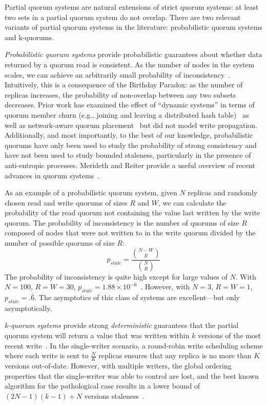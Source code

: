 \documentclass{vldb}
\begin{document}
Partial quorum systems are natural extensions of strict quorum
systems: at least two sets in a partial quorum system do not
overlap.  There are two relevant variants of partial quorum systems in
the literature: probabilistic quorum systems and k-quorums.

\textit{Probabilistic quorum systems} provide probabilistic guarantees
about whether data returned by a quorum read is consistent.  As the
number of nodes in the system scales, we can achieve an arbitrarily
small probability of inconsistency~\cite{prob-quorum}.  Intuitively,
this is a consequence of the Birthday Paradox: as the number of
replicas increases, the probability of non-overlap between any two
subsets decreases.  Prior work has examined the effect of ``dynamic
systems'' in terms of quorum member churn (e.g., joining and leaving a
distributed hash table)~\cite{prob-quorum-dynamic} as well as
network-aware quorum placement~\cite{delay-quorum, quorum-placement}
but did not model write propagation. Additionally, and most
importantly, to the best of our knowledge, probabilistic quorums have
only been used to study the probability of strong consistency and have
not been used to study bounded staleness, particularly in the presence
of anti-entropic processes.  Merideth and Reiter provide a useful
overview of recent advances in quorum systems~\cite{quorum-overview}.

As an example of a probabilistic quorum system, given $N$ replicas and
randomly chosen read and write quorums of sizes $R$ and $W$, we can
calculate the probability of the read quorum not containing the value
last written by the write quorum.  The probability of inconsistency is
the number of quorums of size $R$ composed of nodes that were not
written to in the write quorum divided by the number of possible
quorums of size $R$:
\begin{equation}
\label{eq:prob-strict}
p_{stale}=\frac{{N-W \choose R}}{{N \choose R}}
\end{equation}
The probability of inconsistency is quite high except for large values
of $N$.  With $N=100$, $R=W=30$, $p_{stale} = 1.88 \times
10^{-6}$~\cite{non-strict}.  However, with $N=3$, $R=W=1$, $p_{stale}
= .\overline{6}$.  The asymptotics of this class of systems are
excellent---but only asymptotically.

\textit{$k$-quorum systems} provide strong \textit{deterministic}
guarantees that the partial quorum system will return a value that was
written within $k$ versions of the most recent
write~\cite{non-strict}.  In the single-writer scenario, a round-robin
write scheduling scheme where each write is sent to $\frac{N}{K}$
replicas ensures that any replica is no more than $K$ versions
out-of-date.  However, with multiple writers, the global ordering
properties that the single-writer was able to control are lost, and
the best known algorithm for the pathological case results in a lower
bound of $(2N-1)(k-1)+N$ versions staleness~\cite{multi-k-quorum}.
\end{document}
